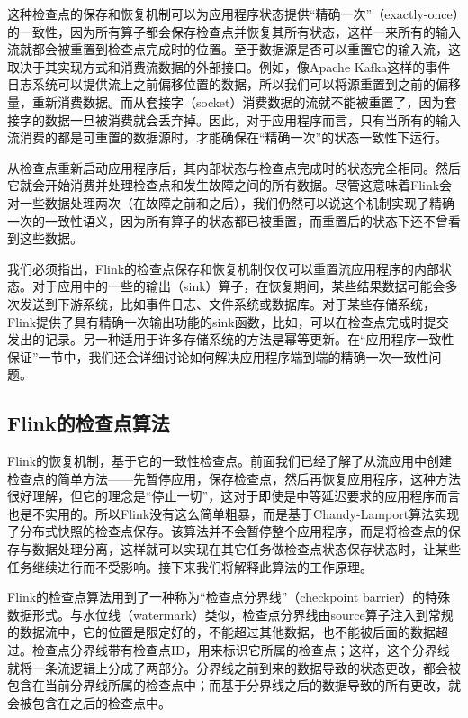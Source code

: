 \documentclass[cn,11pt,chinese]{elegantbook}
\begin{document}
这种检查点的保存和恢复机制可以为应用程序状态提供``精确一次''（exactly-once）的一致性，因为所有算子都会保存检查点并恢复其所有状态，这样一来所有的输入流就都会被重置到检查点完成时的位置。至于数据源是否可以重置它的输入流，这取决于其实现方式和消费流数据的外部接口。例如，像Apache
Kafka这样的事件日志系统可以提供流上之前偏移位置的数据，所以我们可以将源重置到之前的偏移量，重新消费数据。而从套接字（socket）消费数据的流就不能被重置了，因为套接字的数据一旦被消费就会丢弃掉。因此，对于应用程序而言，只有当所有的输入流消费的都是可重置的数据源时，才能确保在``精确一次''的状态一致性下运行。

从检查点重新启动应用程序后，其内部状态与检查点完成时的状态完全相同。然后它就会开始消费并处理检查点和发生故障之间的所有数据。尽管这意味着Flink会对一些数据处理两次（在故障之前和之后），我们仍然可以说这个机制实现了精确一次的一致性语义，因为所有算子的状态都已被重置，而重置后的状态下还不曾看到这些数据。

我们必须指出，Flink的检查点保存和恢复机制仅仅可以重置流应用程序的内部状态。对于应用中的一些的输出（sink）算子，在恢复期间，某些结果数据可能会多次发送到下游系统，比如事件日志、文件系统或数据库。对于某些存储系统，Flink提供了具有精确一次输出功能的sink函数，比如，可以在检查点完成时提交发出的记录。另一种适用于许多存储系统的方法是幂等更新。在``应用程序一致性保证''一节中，我们还会详细讨论如何解决应用程序端到端的精确一次一致性问题。

\hypertarget{flinkux7684ux68c0ux67e5ux70b9ux7b97ux6cd5}{%
\subsection{Flink的检查点算法}\label{flinkux7684ux68c0ux67e5ux70b9ux7b97ux6cd5}}

Flink的恢复机制，基于它的一致性检查点。前面我们已经了解了从流应用中创建检查点的简单方法------先暂停应用，保存检查点，然后再恢复应用程序，这种方法很好理解，但它的理念是``停止一切''，这对于即使是中等延迟要求的应用程序而言也是不实用的。所以Flink没有这么简单粗暴，而是基于Chandy-Lamport算法实现了分布式快照的检查点保存。该算法并不会暂停整个应用程序，而是将检查点的保存与数据处理分离，这样就可以实现在其它任务做检查点状态保存状态时，让某些任务继续进行而不受影响。接下来我们将解释此算法的工作原理。

Flink的检查点算法用到了一种称为``检查点分界线''（checkpoint
barrier）的特殊数据形式。与水位线（watermark）类似，检查点分界线由source算子注入到常规的数据流中，它的位置是限定好的，不能超过其他数据，也不能被后面的数据超过。检查点分界线带有检查点ID，用来标识它所属的检查点；这样，这个分界线就将一条流逻辑上分成了两部分。分界线之前到来的数据导致的状态更改，都会被包含在当前分界线所属的检查点中；而基于分界线之后的数据导致的所有更改，就会被包含在之后的检查点中。
\end{document}
